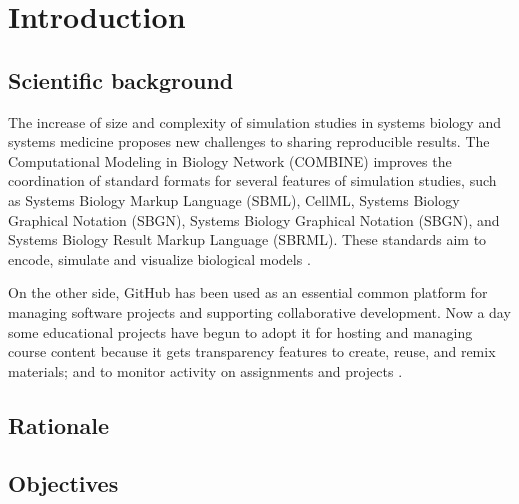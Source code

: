 \section*{Introduction}

\subsection*{Scientific background}
The increase of size and complexity of simulation studies in systems biology and systems medicine proposes new challenges to sharing reproducible results. The Computational Modeling in Biology Network (COMBINE) improves the coordination of standard formats for several features of simulation studies, such as Systems Biology Markup Language (SBML), CellML, Systems Biology Graphical Notation (SBGN), Systems Biology Graphical Notation (SBGN), and Systems Biology Result Markup Language (SBRML). These standards aim to encode, simulate and visualize biological models \cite{combine}.

On the other side, GitHub has been used as an essential common platform for managing software projects and supporting collaborative development. Now a day some educational projects have begun to adopt it for hosting and managing course content because it gets transparency features to create, reuse, and remix materials; and to monitor activity on assignments and projects \cite{github}.

\subsection*{Rationale}

\subsection*{Objectives}
